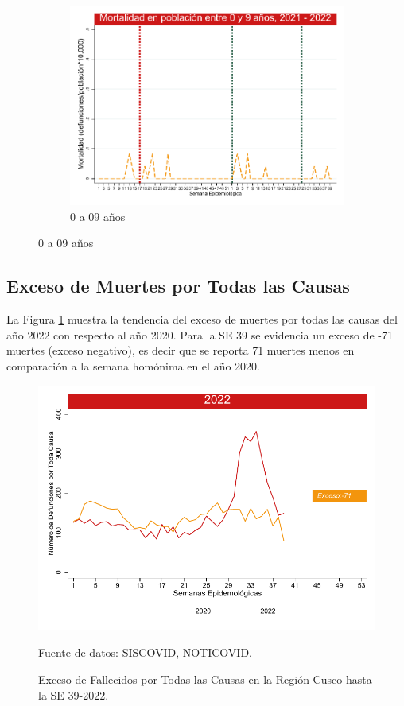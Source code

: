 \documentclass[12pt,a4paper,openany]{book}
\begin{document}
\begin{figure}[h]
		\vspace{10mm}
		\begin{subfigure}[b]{0.45\textwidth}
			\centering
			\includegraphics[width=\textwidth]{../figuras/mortalidad_edad_0.pdf}
			\caption{0 a 09 años}
		\end{subfigure}
	\end{figure}
	\clearpage	
	\subsection*{Exceso de Muertes por Todas las Causas}
	\noindent La Figura \ref{fig:exceso_regional} muestra la tendencia del exceso de muertes por todas las causas del año 2022 con respecto al año 2020.  Para la SE 39 se evidencia un exceso de -71 muertes (exceso negativo), es
	decir que se reporta 71 muertes menos en comparación a la semana homónima en el año 2020.
	
	
	
	\begin{figure}[h]
		\caption{Exceso de Fallecidos por Todas las Causas en la Región Cusco hasta la SE 39-2022.}\label{fig:exceso_regional}
		\begin{center}
			\includegraphics[width=0.85\linewidth]{../figuras/exceso_region_2022.pdf}
		\end{center}
		{\footnotesize {Fuente de datos: SISCOVID, NOTICOVID.}}
	\end{figure}
	\clearpage
	
\end{document}
